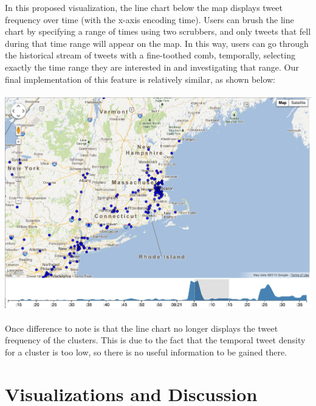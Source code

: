 \documentclass[pdftex,12pt,a4paper]{article}
\begin{document}
In this proposed visualization, the line chart below the map displays tweet frequency over time (with the x-axis encoding time). Users can brush the line chart by specifying a range of times using two scrubbers, and only tweets that fell during that time range will appear on the map. In this way, users can go through the historical stream of tweets with a fine-toothed comb, temporally, selecting exactly the time range they are interested in and investigating that range. Our final implementation of this feature is relatively similar, as shown below: \\ \\
\includegraphics[width=5.5in]{temporal.jpg} \\ \\
Once difference to note is that the line chart no longer displays the tweet frequency of the clusters. This is due to the fact that the temporal tweet density for a cluster is too low, so there is no useful information to be gained there. 

\section{Visualizations and Discussion} 
\end{document}
